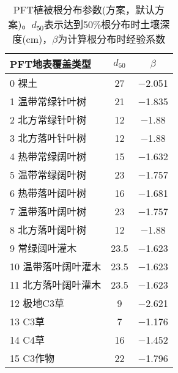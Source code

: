 \begin{table}[htbp]
  \centering
  \caption[PFT植被根分布参数(\citet{schenk2002rooting}方案)]{PFT植被根分布参数(\citet{schenk2002rooting}方案，默认方案)。$d_{50}$表示达到50\%根分布时土壤深度(cm)，$\beta$为计算根分布时经验系数}
  \label{tab:PFTSchenkANDJackson2002方案默认方案}
  \begin{tabular}{@{}lcc@{}}
    \toprule
    PFT地表覆盖类型     & $d_{50}$ & $\beta$         \\ \midrule
    0 裸土              & 27       & \num { -2.051 } \\
    1 温带常绿针叶树    & 21       & \num { -1.835 } \\
    2 北方常绿针叶树    & 12       & \num { -1.88  } \\
    3 北方落叶针叶树    & 12       & \num { -1.88  } \\
    4 热带常绿阔叶树    & 15       & \num { -1.632 } \\
    5 温带常绿阔叶树    & 23       & \num { -1.757 } \\
    6 热带落叶阔叶树    & 16       & \num { -1.681 } \\
    7 温带落叶阔叶树    & 23       & \num { -1.757 } \\
    8 北方落叶阔叶树    & 12       & \num { -1.88  } \\
    9 常绿阔叶灌木      & 23.5     & \num { -1.623 } \\
    10 温带落叶阔叶灌木 & 23.5     & \num { -1.623 } \\
    11 北方落叶阔叶灌木 & 23.5     & \num { -1.623 } \\
    12 极地C3草         & 9        & \num { -2.621 } \\
    13 C3草             & 7        & \num { -1.176 } \\
    14 C4草             & 16       & \num { -1.452 } \\
    15 C3作物           & 22       & \num { -1.796 } \\ \bottomrule
  \end{tabular}
\end{table}


